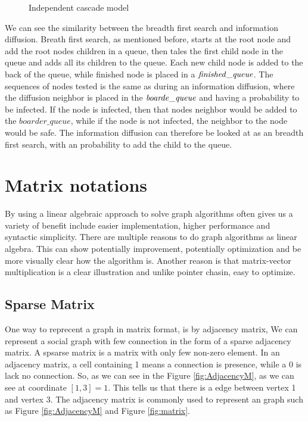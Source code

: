 {\begin{figure}[!ht]
	\caption{Independent cascade model}
\end{figure}

We can see the similarity between the breadth first search and information diffusion. Breath first search, as mentioned before, starts at the root node and add the root nodes children in a queue, then tales the first child node in the queue and adds all its children to the queue. Each new child node is added to the back of the queue, while finished node is placed in a $\it{finished\_queue}$. The sequences of nodes tested is the same as during an information diffusion, where the diffusion neighbor is placed in the $ \it{boarde\_queue} $ and having a probability to be infected. If the node is infected, then that nodes neighbor would be added to the $boarder\_queue$, while if the node is not infected, the neighbor to the node would be safe. The information diffusion can therefore be looked at as an breadth first search, with an probability to add the child to the queue. 

\section{Matrix notations}
By using a linear algebraic approach to solve graph algorithms often gives us a variety of benefit include easier implementation, higher performance and syntactic simplicity\cite{MathToAlgo}. There are multiple reasons to do graph algorithms as linear algebra. This can show potentially improvement, potentially optimization and be more visually clear how the algorithm is. Another reason is that matrix-vector multiplication is a clear illustration and unlike pointer chasin, easy to optimize.  

\subsection{Sparse Matrix}
One way to reprecent a graph in matrix format, is by adjacency matrix, We can represent a social graph with few connection in the form of a sparse adjacency matrix. A spsarse matrix is a matrix with only few non-zero element. In an adjacency matrix, a cell containing 1 means a connection is presence, while a 0 is lack no connection. So, as we can see in the Figure \ref{fig:AdjacencyM}, as we can see at coordinate $[1,3] = 1$. This tells us that there is a edge between vertex 1 and vertex 3. The adjacency matrix is commonly used to represent an graph such as Figure \ref{fig:AdjacencyM} and Figure \ref{fig:matrix}.

}
